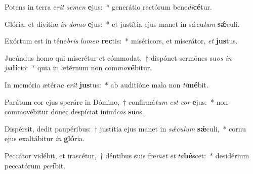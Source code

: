 \item Potens in terra e\textit{rit} \textit{se}\textit{men} \textbf{e}jus:~* generátio rectórum bene\textit{di}\textbf{cé}tur.
\item Glória, et divítiæ \textit{in} \textit{do}\textit{mo} \textbf{e}jus:~* et justítia ejus manet in sǽcu\textit{lum} \textbf{sǽ}culi.
\item Exórtum est in téne\textit{bris} \textit{lu}\textit{men} \textbf{rec}tis:~* miséricors, et miserátor, \textit{et} \textbf{jus}tus.
\item Jucúndus homo qui miserétur et cómmodat,~† dispónet sermónes su\textit{os} \textit{in} \textit{ju}\textbf{dí}cio:~* quia in ætérnum non com\textit{mo}\textbf{vé}bitur.
\item In memória ætér\textit{na} \textit{e}\textit{rit} \textbf{jus}tus:~* ab auditióne mala non \textit{ti}\textbf{mé}bit.
\item Parátum cor ejus speráre in Dómino,~† confirmá\textit{tum} \textit{est} \textit{cor} \textbf{e}jus:~* non commovébitur donec despíciat inimí\textit{cos} \textbf{su}os.
\item Dispérsit, dedit paupéribus:~† justítia ejus manet in \textit{sǽ}\textit{cu}\textit{lum} \textbf{sǽ}culi,~* cornu ejus exaltábitur \textit{in} \textbf{gló}ria.
\item Peccátor vidébit, et irascétur,~† déntibus suis fre\textit{met} \textit{et} \textit{ta}\textbf{bé}scet:~* desidérium peccatórum \textit{per}\textbf{í}bit.
